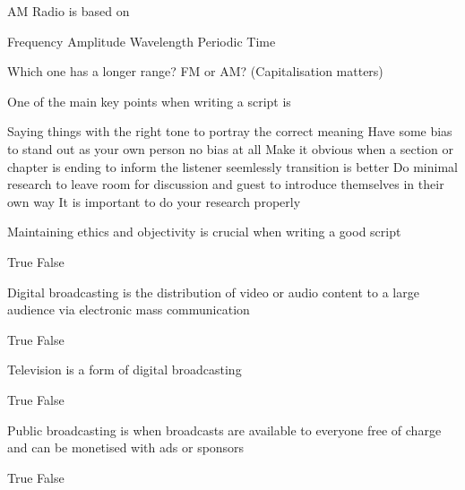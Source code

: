 \documentclass[theme=sleek, randomorder, hidesidemenu]{webquiz}
\begin{document}
\begin{question}
  AM Radio is based on
  \begin{choice}
    \incorrect Frequency
    \correct Amplitude
    \incorrect Wavelength
    \incorrect Periodic Time
  \end{choice}
\end{question}

\begin{question}
  Which one has a longer range? FM or AM? (Capitalisation matters)
\end{question}

\begin{question}
  One of the main key points when writing a script is
  \begin{choice}
    \correct Saying things with the right tone to portray the correct meaning
    \incorrect Have some bias to stand out as your own person
    \feedback no bias at all
    \incorrect Make it obvious when a section or chapter is ending to inform the listener
    \feedback seemlessly transition is better
    \incorrect Do minimal research to leave room for discussion and guest to introduce themselves in their own way
    \feedback It is important to do your research properly
  \end{choice}
\end{question}

\begin{question}
    Maintaining ethics and objectivity is crucial when writing a good script
  \begin{choice}
    \correct True
    \incorrect False
  \end{choice}
\end{question}

\begin{question}
    Digital broadcasting is the distribution of video or audio content to a large audience via electronic mass communication
  \begin{choice}
    \correct True
    \incorrect False
  \end{choice}
\end{question}


\begin{question}
  Television is a form of digital broadcasting
  \begin{choice}
    \correct True
    \incorrect False
  \end{choice}
\end{question}

\begin{question}
  Public broadcasting is when broadcasts are available to everyone free of charge and can be monetised with ads or sponsors
  \begin{choice}
    \incorrect True
    \correct False
  \end{choice}
\end{question}
\end{document}

